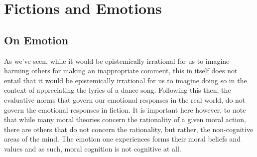 \documentclass[
  12pt,
]{book}
\theoremstyle{definition}
\theoremstyle{definition}
\theoremstyle{definition}
\theoremstyle{definition}
\theoremstyle{remark}
\begin{document}
\section{Fictions and Emotions}\label{fictions-and-emotions}

\subsection*{On Emotion}\label{on-emotion}

As we've seen, while it would be epistemically irrational for us to imagine harming others for making an inappropriate comment, this in itself does not entail that it would be epistemically irrational for us to imagine doing so in the context of appreciating the lyrics of a dance song. Following this then, the evaluative norms that govern our emotional responses in the real world, do not govern the emotional responses in fiction. It is important here however, to note that while many moral theories concern the rationality of a given moral action, there are others that do not concern the rationality, but rather, the non-cognitive areas of the mind. The emotion one experiences forms their moral beliefs and values and as such, moral cognition is not cognitive at all.
\end{document}
